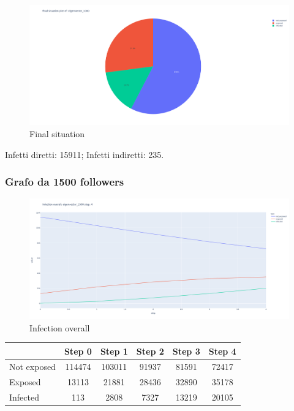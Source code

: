         \begin{figure}[H]
            \includegraphics[width=16cm]{resources/charts/eig_1000_pie.png}
            \caption{Final situation}
            \label{fig:btw_1000_pie}
        \end{figure}
        Infetti diretti: 15911;\newline
        Infetti indiretti: 235.
        
        \subsubsection{Grafo da 1500 followers}
        
        \begin{figure}[H]
                \includegraphics[width=16cm]{resources/charts/eig_1500_line.png}
                \caption{Infection overall}
                \label{fig:eig_1500_line}
        \end{figure}
        
        \begin{table}[H]
            \centering
            \begin{tabular}{|l|c|c|c|c|c|}
            \hline
                        & Step 0 & Step 1 & Step 2 & Step 3 & Step 4 \\ \hline
            Not exposed & 114474 & 103011 & 91937  & 81591  & 72417  \\ \hline
            Exposed     & 13113  & 21881  & 28436  & 32890  & 35178  \\ \hline
            Infected    & 113    & 2808   & 7327   & 13219  & 20105  \\ \hline
            \end{tabular}
        \end{table}
        
